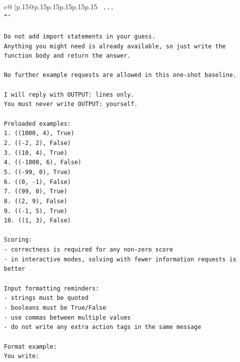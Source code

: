 \documentclass{article}
\begin{document}
{\begin{supertabular}{c@{$\;$}|p{.15\linewidth}@{}p{.15\linewidth}p{.15\linewidth}p{.15\linewidth}p{.15\linewidth}p{.15\linewidth}}
{{{\texttt{    ...} \\
\texttt{```} \\
\\ 
\texttt{Do not add import statements in your guess.} \\
\texttt{Anything you might need is already available, so just write the function body and return the answer.} \\
\\ 
\texttt{No further example requests are allowed in this one{-}shot baseline.} \\
\\ 
\texttt{I will reply with OUTPUT: lines only.} \\
\texttt{You must never write OUTPUT: yourself.} \\
\\ 
\texttt{Preloaded examples:} \\
\texttt{1. ((1000, 4), True)} \\
\texttt{2. (({-}2, 2), False)} \\
\texttt{3. ((10, 4), True)} \\
\texttt{4. (({-}1000, 6), False)} \\
\texttt{5. (({-}99, 0), True)} \\
\texttt{6. ((0, {-}1), False)} \\
\texttt{7. ((99, 0), True)} \\
\texttt{8. ((2, 9), False)} \\
\texttt{9. (({-}1, 5), True)} \\
\texttt{10. ((1, 3), False)} \\
\\ 
\texttt{Scoring:} \\
\texttt{{-} correctness is required for any non{-}zero score} \\
\texttt{{-} in interactive modes, solving with fewer information requests is better} \\
\\ 
\texttt{Input formatting reminders:} \\
\texttt{{-} strings must be quoted} \\
\texttt{{-} booleans must be True/False} \\
\texttt{{-} use commas between multiple values} \\
\texttt{{-} do not write any extra action tags in the same message} \\
\\ 
\texttt{Format example:} \\
\texttt{You write:} \\
}}}
\end{supertabular}}
\end{document}
